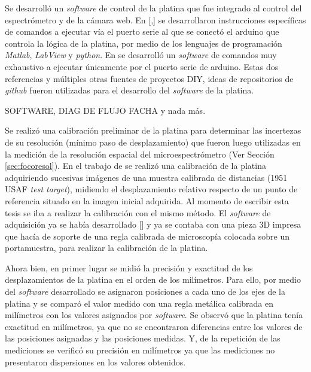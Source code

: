 \hspace{0.5cm}Se desarrolló un \textit{software} de control de la platina que fue integrado al control del espectrómetro y de la cámara web. En [\cite{campbells},\href{https://github.com/raacampbell/openstage/tree/master/serialInterfaceScripts}{\faGithub}] se desarrollaron instrucciones específicas de comandos a ejecutar vía el puerto serie al que se conectó el arduino que controla la lógica de la platina, por medio de los lenguajes de programación \textit{Matlab}, \textit{LabView} y \textit{python}. En \href{https://forum.arduino.cc/index.php?topic=469343}{\faCode} se desarrolló un \textit{software} de comandos muy exhaustivo a ejecutar únicamente por el puerto serie de arduino. Estas dos referencias y múltiples otras fuentes de proyectos DIY, ideas de repositorios de \textit{github} fueron utilizadas para el desarrollo del \textit{software} de la platina.

SOFTWARE, DIAG DE FLUJO FACHA y nada más.


Se realizó una calibración preliminar de la platina para determinar las incertezas de su resolución (mínimo paso de desplazamiento) que fueron luego utilizadas en la medición de la resolución espacial del microespectrómetro (Ver Sección \ref{sec:focoresol}). En el trabajo de \cite{schaa} se realizó una calibración de la platina adquiriendo sucesivas imágenes de una muestra calibrada de distancias (1951 USAF \textit{test target}), midiendo el desplazamiento relativo respecto de un punto de referencia situado en la imagen inicial adquirida. Al momento de escribir esta tesis se iba a realizar la calibración con el mismo método. El \textit{software} de adquisición ya se había desarrollado [\href{https://github.com/jrr1984/defectsGUI/blob/master/views.py}{\faGithub}] y ya se contaba con una pieza 3D impresa que hacía de soporte de una regla calibrada de microscopía colocada sobre un portamuestra, para realizar la calibración de la platina.

Ahora bien, en primer lugar se midió la precisión y exactitud de los desplazamientos de la platina en el orden de los milímetros. Para ello, por medio del \textit{software} desarrollado se asignaron posiciones a cada uno de los ejes de la platina y se comparó el valor medido con una regla metálica calibrada en milímetros con los valores asignados por \textit{software}. Se observó que la platina tenía exactitud en milímetros, ya que no se encontraron diferencias entre los valores de las posiciones asignadas y las posiciones medidas. Y, de la repetición de las mediciones se verificó su precisión en milímetros ya que las mediciones no presentaron dispersiones en los valores obtenidos.

